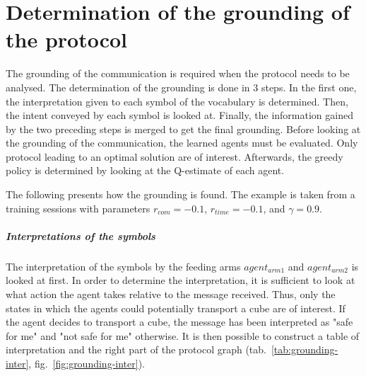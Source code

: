 \chapter{Determination of the grounding of the protocol}
\label{app:grounding}	

The grounding of the communication is required when the protocol needs to be analysed. The determination of the grounding is done in 3 steps. In the first one, the interpretation given to each symbol of the vocabulary is determined. Then, the intent conveyed by each symbol is looked at. Finally, the information gained by the two preceding steps is merged to get the final grounding. Before looking at the grounding of the communication, the learned agents must be evaluated. Only protocol leading to an optimal solution are of interest. Afterwards, the greedy policy is determined by looking at the Q-estimate of each agent.

The following presents how the grounding is found. The example is taken from a training sessions with parameters $r_{com} = -0.1$, $r_{time} = -0.1$,  and $\gamma = 0.9$.

\paragraph*{Interpretations of the symbols}
The interpretation of the symbols by the feeding arms $agent_{arm1}$ and $agent_{arm2}$ is looked at first. In order to determine the interpretation, it is sufficient to look at what action the agent takes relative to the message received. Thus, only the states in which the agents could potentially transport a cube are of interest. If the agent decides to transport a cube, the message has been interpreted as "safe for me" and "not safe for me" otherwise. It is then possible to construct a table of interpretation and the right part of the protocol graph (tab.~\ref{tab:grounding-inter}, fig.~\ref{fig:grounding-inter}). 

